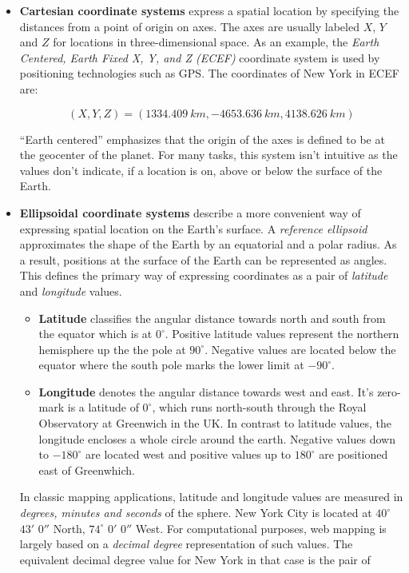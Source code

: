 \begin{itemize}

\item \textbf{Cartesian coordinate systems} express a spatial location by specifying the distances from a point of origin on axes. The axes are usually labeled $X$, $Y$ and $Z$ for locations in three-dimensional space. As an example, the \textit{Earth Centered, Earth Fixed X, Y, and Z (ECEF)} coordinate system is used by positioning technologies such as GPS. The coordinates of New York in ECEF are:

\[ (X, Y, Z) = (1334.409~km, -4653.636~km, 4138.626~km) \]

``Earth centered'' emphasizes that the origin of the axes is defined to be at the geocenter of the planet. For many tasks, this system isn't intuitive as the values don't indicate, if a location is on, above or below the surface of the Earth. 

\item \textbf{Ellipsoidal coordinate systems} describe a more convenient way of expressing spatial location on the Earth's surface. A \textit{reference ellipsoid} approximates the shape of the Earth by an equatorial and a polar radius. As a result, positions at the surface of the Earth can be represented as angles. This defines the primary way of expressing coordinates as a pair of \textit{latitude} and \textit{longitude} values.

  \begin{itemize}

  \item \textbf{Latitude} classifies the angular distance towards north and south from the equator which is at $0^\circ$. Positive latitude values represent the northern hemisphere up the the pole at $90^\circ$. Negative values are located below the equator where the south pole marks the lower limit at $-90^\circ$.

  \item \textbf{Longitude} denotes the angular distance towards west and east. It's zero-mark is a latitude of $0^\circ$,  which runs north-south through the Royal Observatory at Greenwich in the UK. In contrast to latitude values, the longitude encloses a whole circle around the earth. Negative values down to $-180^\circ$ are located west and positive values up to $180^\circ$ are positioned east of Greenwhich.

  \end{itemize}

In classic mapping applications, latitude and longitude values are measured in \textit{degrees, minutes and seconds} of the sphere. New York City is located at $40^\circ$ $43'$ $0''$ North, $74^\circ$ $0'$ $0''$ West. For computational purposes, web mapping is largely based on a \textit{decimal degree} representation of such values. The equivalent decimal degree value for New York in that case is the pair of


\end{itemize}
